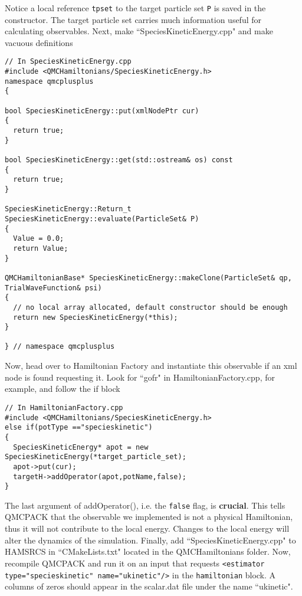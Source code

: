 \documentclass[aps,prl,preprint]{revtex4-1}
\begin{document}
Notice a local reference \verb|tpset| to the target particle set \verb|P| is saved in the constructor. The target particle set carries much information useful for calculating observables. Next, make ``SpeciesKineticEnergy.cpp" and make vacuous definitions
\begin{lstlisting}
// In SpeciesKineticEnergy.cpp
#include <QMCHamiltonians/SpeciesKineticEnergy.h>
namespace qmcplusplus
{

bool SpeciesKineticEnergy::put(xmlNodePtr cur)
{
  return true;
} 

bool SpeciesKineticEnergy::get(std::ostream& os) const
{ 
  return true;
}

SpeciesKineticEnergy::Return_t SpeciesKineticEnergy::evaluate(ParticleSet& P)
{
  Value = 0.0;
  return Value;
}

QMCHamiltonianBase* SpeciesKineticEnergy::makeClone(ParticleSet& qp, TrialWaveFunction& psi)
{
  // no local array allocated, default constructor should be enough
  return new SpeciesKineticEnergy(*this);
}

} // namespace qmcplusplus
\end{lstlisting}

Now, head over to Hamiltonian Factory and instantiate this observable if an xml node is found requesting it. Look for ``gofr" in HamiltonianFactory.cpp, for example, and follow the if block
\begin{lstlisting}
// In HamiltonianFactory.cpp
#include <QMCHamiltonians/SpeciesKineticEnergy.h>
else if(potType =="specieskinetic")
{        
  SpeciesKineticEnergy* apot = new SpeciesKineticEnergy(*target_particle_set);
  apot->put(cur);
  targetH->addOperator(apot,potName,false);
}
\end{lstlisting}
The last argument of addOperator(), i.e. the \verb|false| flag, is \textbf{crucial}. This tells QMCPACK that the observable we implemented is not a physical Hamiltonian, thus it will not contribute to the local energy. Changes to the local energy will alter the dynamics of the simulation. Finally, add ``SpeciesKineticEnergy.cpp" to HAMSRCS in ``CMakeLists.txt" located in the QMCHamiltonians folder. Now, recompile QMCPACK and run it on an input that requests \verb|<estimator type="specieskinetic" name="ukinetic"/>| in the \verb|hamiltonian| block. A columns of zeros should appear in the scalar.dat file under the name ``ukinetic".
\end{document}
